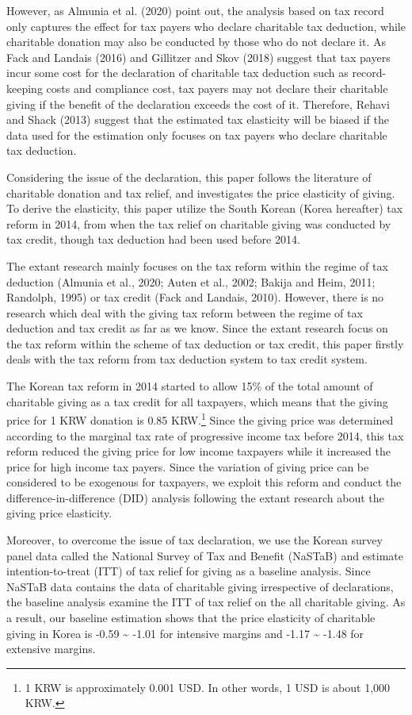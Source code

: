 \documentclass[
  11pt,
  a4paper,
]{article}
\begin{document}
However, as Almunia et al. (2020) point out, the analysis based on tax record only captures the effect for tax payers who declare charitable tax deduction, while charitable donation may also be conducted by those who do not declare it. As Fack and Landais (2016) and Gillitzer and Skov (2018) suggest that tax payers incur some cost for the declaration of charitable tax deduction such as record-keeping costs and compliance cost, tax payers may not declare their charitable giving if the benefit of the declaration exceeds the cost of it. Therefore, Rehavi and Shack (2013) suggest that the estimated tax elasticity will be biased if the data used for the estimation only focuses on tax payers who declare charitable tax deduction.

Considering the issue of the declaration, this paper follows the literature of charitable donation and tax relief, and investigates the price elasticity of giving. To derive the elasticity, this paper utilize the South Korean (Korea hereafter) tax reform in 2014, from when the tax relief on charitable giving was conducted by tax credit, though tax deduction had been used before 2014.

The extant research mainly focuses on the tax reform within the regime of tax deduction (Almunia et al., 2020; Auten et al., 2002; Bakija and Heim, 2011; Randolph, 1995) or tax credit (Fack and Landais, 2010). However, there is no research which deal with the giving tax reform between the regime of tax deduction and tax credit as far as we know. Since the extant research focus on the tax reform within the scheme of tax deduction or tax credit, this paper firstly deals with the tax reform from tax deduction system to tax credit system.

The Korean tax reform in 2014 started to allow 15\% of the total amount of charitable giving as a tax credit for all taxpayers, which means that the giving price for 1 KRW donation is 0.85 KRW.\footnote{1 KRW is approximately 0.001 USD. In other words, 1 USD is about 1,000 KRW.} Since the giving price was determined according to the marginal tax rate of progressive income tax before 2014, this tax reform reduced the giving price for low income taxpayers while it increased the price for high income tax payers. Since the variation of giving price can be considered to be exogenous for taxpayers, we exploit this reform and conduct the difference-in-difference (DID) analysis following the extant research about the giving price elasticity.

Moreover, to overcome the issue of tax declaration, we use the Korean survey panel data called the National Survey of Tax and Benefit (NaSTaB) and estimate intention-to-treat (ITT) of tax relief for giving as a baseline analysis. Since NaSTaB data contains the data of charitable giving irrespective of declarations, the baseline analysis examine the ITT of tax relief on the all charitable giving.
As a result, our baseline estimation shows that the price elasticity of charitable giving in Korea is -0.59 \textasciitilde{} -1.01 for intensive margins and -1.17 \textasciitilde{} -1.48 for extensive margins.
\end{document}
